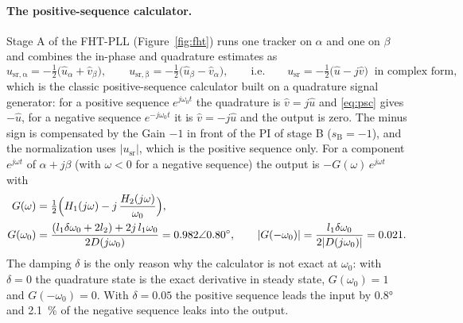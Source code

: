 \documentclass[11pt,a4paper]{scrartcl}
\newcommand{\ped}[1]{_{\mathrm{#1}}}
\begin{document}
\begin{onehalfspace}
\paragraph{The positive-sequence calculator.} Stage A of the FHT-PLL (Figure~\ref{fig:fht}) runs one tracker on $\alpha$ and one on $\beta$ and combines the in-phase and quadrature estimates as
\begin{equation}
	u\ped{sr,\alpha} = -\tfrac{1}{2}\big(\hat u_\alpha + \hat v_\beta\big), \qquad u\ped{sr,\beta} = -\tfrac{1}{2}\big(\hat u_\beta - \hat v_\alpha\big),
	\qquad\text{i.e.}\qquad u\ped{sr} = -\tfrac{1}{2}\big(\hat u - j\hat v\big) \ \text{ in complex form},
	\label{eq:psc}
\end{equation}
which is the classic positive-sequence calculator built on a quadrature signal generator: for a positive sequence $e^{j\omega_0 t}$ the quadrature is $\hat v = j\hat u$ and \eqref{eq:psc} gives $-\hat u$, for a negative sequence $e^{-j\omega_0 t}$ it is $\hat v = -j\hat u$ and the output is zero. The minus sign is compensated by the Gain $-1$ in front of the PI of stage B ($s\ped{B} = -1$), and the normalization uses $|u\ped{sr}|$, which is the positive sequence only. For a component $e^{j\omega t}$ of $\alpha + j\beta$ (with $\omega < 0$ for a negative sequence) the output is $-G(\omega)\, e^{j\omega t}$ with
\begin{align}
	G(\omega) &= \tfrac{1}{2}\Big(H_1(j\omega) - j\,\frac{H_2(j\omega)}{\omega_0}\Big), \notag \\
	G(\omega_0) &= \frac{(l_1\delta\omega_0 + 2 l_2) + 2j\, l_1\omega_0}{2 D(j\omega_0)} = 0.982\angle\ang{+0.80},
	\qquad
	|G(-\omega_0)| = \frac{l_1\delta\omega_0}{2|D(j\omega_0)|} = 0.021 .
	\label{eq:G}
\end{align}
The damping $\delta$ is the only reason why the calculator is not exact at $\omega_0$: with $\delta = 0$ the quadrature state is the exact derivative in steady state, $G(\omega_0) = 1$ and $G(-\omega_0) = 0$. With $\delta = 0.05$ the positive sequence leads the input by \ang{0.8} and \num{2.1}~\% of the negative sequence leaks into the output.


\end{onehalfspace}
\end{document}
